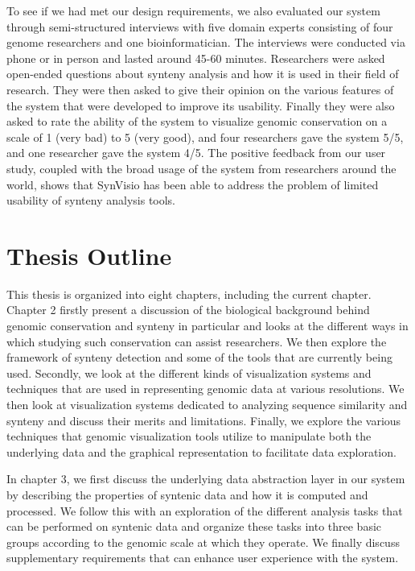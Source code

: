 To see if we had met our design requirements, we also evaluated our system through semi-structured interviews with five domain experts consisting of four genome researchers and one bioinformatician. The interviews were conducted via phone or in person and lasted around 45-60 minutes. Researchers were asked open-ended questions about synteny analysis and how it is used in their field of research. They were then asked to give their opinion on the various features of the system that were developed to improve its usability. Finally they were also asked to rate the ability of the system to visualize genomic conservation on a scale of 1 (very bad) to 5 (very good), and four researchers gave the system 5/5, and one researcher gave the system 4/5. The positive feedback from our user study, coupled with the broad usage of the system from researchers around the world, shows that SynVisio has been able to address the problem of limited usability of synteny analysis tools.

\section{Thesis Outline}

This thesis is organized into eight chapters, including the current chapter. Chapter 2 firstly present a discussion of the biological background behind genomic conservation and synteny in particular and looks at the different ways in which studying such conservation can assist researchers. We then explore the framework of synteny detection and some of the tools that are currently being used. Secondly, we look at the different kinds of visualization systems and techniques that are used in representing genomic data at various resolutions. We then look at visualization systems dedicated to analyzing sequence similarity and synteny and discuss their merits and limitations. Finally, we explore the various techniques that genomic visualization tools utilize to manipulate both the underlying data and the graphical representation to facilitate data exploration.

In chapter 3, we first discuss the underlying data abstraction layer in our system by describing the properties of syntenic data and how it is computed and processed. We follow this with an exploration of the different analysis tasks that can be performed on syntenic data and organize these tasks into three basic groups according to the genomic scale at which they operate. We finally discuss supplementary requirements that can enhance user experience with the system.

